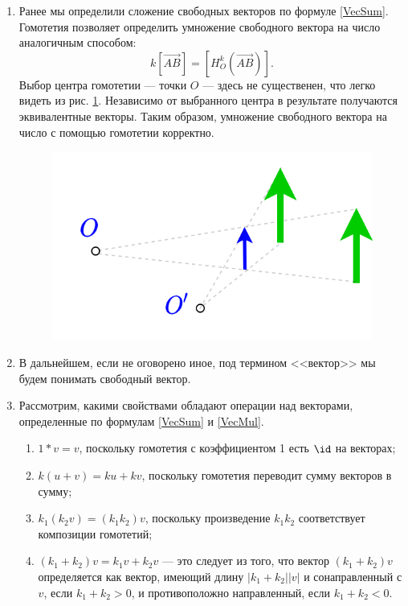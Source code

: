 \begin{enumerate}
\item Ранее мы определили сложение свободных векторов по формуле \eqref{VecSum}. Гомотетия позволяет определить умножение свободного вектора на число аналогичным способом:
\begin{equation}\label{VecMul}
k[\vec{AB}] = [H_O^k(\vec{AB})].
\end{equation}
Выбор центра гомотетии --- точки $O$ --- здесь не существенен, что легко видеть из рис. \ref{freeHomot}. Независимо от выбранного центра в результате получаются эквивалентные векторы. Таким образом, умножение свободного вектора на число с помощью гомотетии корректно.

\begin{figure}[hbt!]
\begin{center}
\includegraphics[scale=0.4]{freeHomot.png}
\end{center}\caption{}\label{freeHomot}
\end{figure}

\item В дальнейшем, если не оговорено иное, под термином <<вектор>> мы будем понимать свободный вектор.

\item Рассмотрим, какими свойствами обладают операции над векторами, определенные по формулам \eqref{VecSum} и \eqref{VecMul}.

\begin{enumerate}[V1]
\item $1*v=v$, поскольку гомотетия с коэффициентом 1 есть $\id$ на векторах;
\item $k(u+v)=ku+kv$, поскольку гомотетия переводит сумму векторов в сумму;
\item $k_1(k_2v)=(k_1k_2)v$, поскольку произведение $k_1k_2$ соответствует композиции гомотетий;
\item $(k_1+k_2)v=k_1v+k_2v$ --- это следует из того, что вектор $(k_1+k_2)v$ определяется как вектор, имеющий длину $|k_1+k_2||v|$ и сонаправленный с $v$, если $k_1+k_2>0$, и противоположно направленный, если $k_1+k_2<0$.
\end{enumerate}


\end{enumerate}
